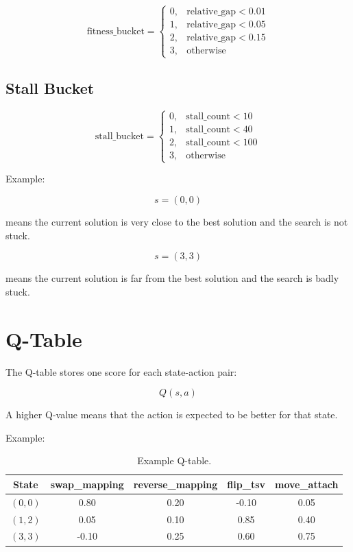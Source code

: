 \documentclass[11pt]{article}
\begin{document}
\[
\text{fitness\_bucket} =
\begin{cases}
0, & \text{relative\_gap} < 0.01 \\
1, & \text{relative\_gap} < 0.05 \\
2, & \text{relative\_gap} < 0.15 \\
3, & \text{otherwise}
\end{cases}
\]

\subsection{Stall Bucket}

\[
\text{stall\_bucket} =
\begin{cases}
0, & \text{stall\_count} < 10 \\
1, & \text{stall\_count} < 40 \\
2, & \text{stall\_count} < 100 \\
3, & \text{otherwise}
\end{cases}
\]

Example:

\[
s = (0,0)
\]

means the current solution is very close to the best solution and the search is
not stuck.

\[
s = (3,3)
\]

means the current solution is far from the best solution and the search is badly
stuck.

\section{Q-Table}

The Q-table stores one score for each state-action pair:

\[
Q(s,a)
\]

A higher Q-value means that the action is expected to be better for that
state.

Example:

\begin{table}[h]
\centering
\begin{tabular}{c c c c c}
\toprule
State & swap\_mapping & reverse\_mapping & flip\_tsv & move\_attach \\
\midrule
$(0,0)$ & 0.80 & 0.20 & -0.10 & 0.05 \\
$(1,2)$ & 0.05 & 0.10 & 0.85 & 0.40 \\
$(3,3)$ & -0.10 & 0.25 & 0.60 & 0.75 \\
\bottomrule
\end{tabular}
\caption{Example Q-table.}
\end{table}
\end{document}
